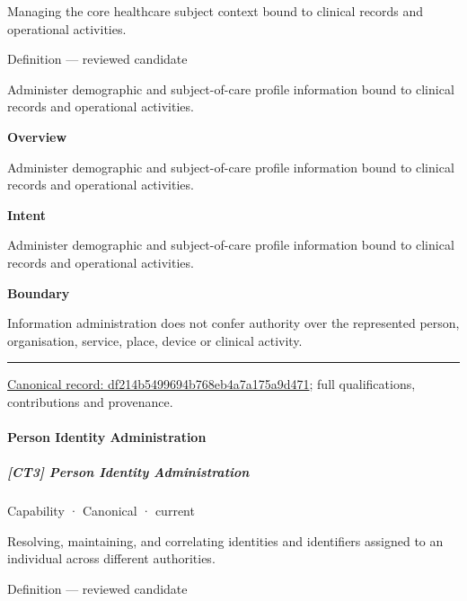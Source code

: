 Managing the core healthcare subject context bound to clinical records and operational activities.



Definition — reviewed candidate



Administer demographic and subject-of-care profile information bound to clinical records and operational activities.



\textbf{Overview}



Administer demographic and subject-of-care profile information bound to clinical records and operational activities.



\textbf{Intent}



Administer demographic and subject-of-care profile information bound to clinical records and operational activities.



\textbf{Boundary}



Information administration does not confer authority over the represented person, organisation, service, place, device or clinical activity.



\medskip\hrule\medskip

{\footnotesize \href{../../../../continuum/strategy/capability/df214b5499694b768eb4a7a175a9d471.md}{Canonical record: df214b5499694b768eb4a7a175a9d471}; full qualifications, contributions and provenance.}\par
\paragraph{Person Identity Administration}

\subparagraph{[CT3] Person Identity Administration}

\label{element:6c3de7750ef1436cad6a9533731782b6}
{\small Capability · Canonical · current}\par

Resolving, maintaining, and correlating identities and identifiers assigned to an individual across different authorities.



Definition — reviewed candidate



